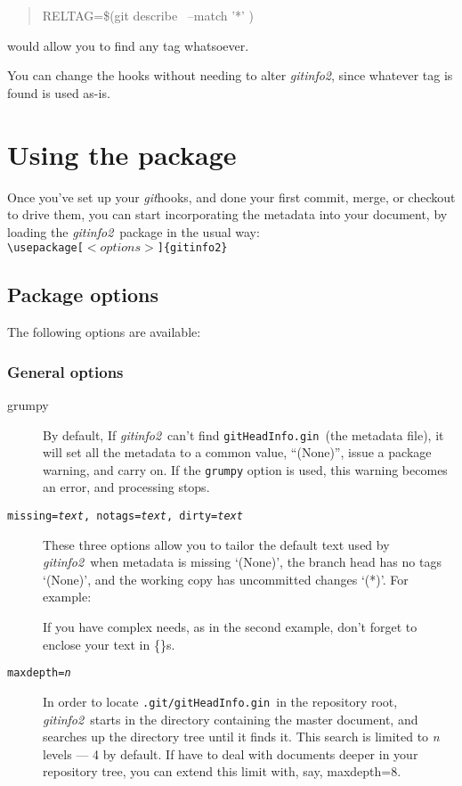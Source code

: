 \documentclass[a4paper,12pt,twoside,openany]{memoir}
\newcommand{\sfit}[1]{\textit{#1}}
\newcommand{\git}{\sfit{git}}
\newcommand{\tpname}{\sfit{gitinfo2}}
\newcommand{\ginname}{gitHeadInfo.gin}
\newcommand{\metaname}{\texttt{\ginname}}
\newcommand{\metapath}{\texttt{.git/\ginname}}
\begin{document}
\begin{quotation}
{\ttfamily
RELTAG=\$(git describe \textellipsis\ --match '*' \textellipsis)
}
\end{quotation}
would allow you to find any tag whatsoever.

You can change the hooks without needing to alter \tpname,
since whatever tag is found is used as-is.

\chapter{Using the package}
\label{ch:using}
Once you've set up your \git hooks, and done your first commit,
merge, or checkout to drive them,
you can start incorporating the metadata into your document,
by loading the \tpname\ package in the usual way:\\[0.5\baselineskip]
\texttt{\textbackslash usepackage[$<options>$]\{gitinfo2\}}

\section{Package options}

The following options are available:

\subsection{General options}

\begin{description}

\item[grumpy]
By default, If \tpname\ can't find \metaname\ (the metadata file),
it will set all the metadata to a common value, ``(None)'',
issue a package warning, and carry on.
If the \texttt{grumpy} option is used,
this warning becomes an error, and processing stops.

\item[\texttt{missing=\textit{text}, notags=\textit{text}, dirty=\textit{text}}]
These three options allow you to tailor the default text used by \tpname\ when
metadata is missing `(None)',
the branch head has no tags `(None)',
and the working copy has uncommitted changes `(*)'.
For example:

\begin{quote}
{\ttfamily
[missing=Help!,notags=\{No\,tags?\},dirty=Eww!]
}
\end{quote}
If you have complex needs, as in the second example,
don't forget to enclose your text in \{\}s.

\item[\texttt{maxdepth=\textit{n}}]
In order to locate \metapath\ in the repository root,
\tpname\ starts in the directory containing the master document,
and searches up the directory tree until it finds it.
This search is limited to {\ttfamily\itshape n} levels --- 4 by default.
If have to deal with documents
deeper in your repository tree, you can extend this limit with, say,
{\ttfamily maxdepth=8}.

\end{description}
\clearpage
\end{document}
